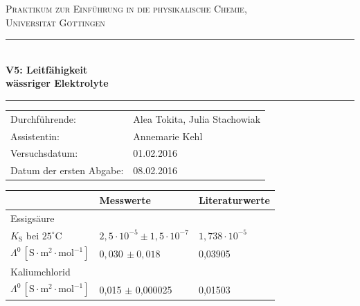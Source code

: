 \documentclass[12pt,a4paper,titlepage,headinclude,bibtotoc]{scrartcl}
\begin{document}
\begin{titlepage}
\centering
\textsc{\Large Praktikum zur Einführung in die physikalische Chemie,\\[1.5ex] Universität Göttingen}

\vspace*{0.5cm}

\rule{\textwidth}{1pt}\\[0.5cm]
{\huge \bfseries
  V5: Leitfähigkeit\\[1.5ex]
  wässriger Elektrolyte}\\[0.5cm]
\rule{\textwidth}{1pt}

\vspace*{0.5cm}


\begin{Large}
\begin{tabular}{ll}
Durchführende: &  Alea Tokita, Julia Stachowiak\\
Assistentin: & Annemarie Kehl\\
 Versuchsdatum: & 01.02.2016\\
 Datum der ersten Abgabe: & 08.02.2016\\

\end{tabular}
\end{Large}

\vspace*{1cm}
\begin{large}
\begin{table} [h]
\centering 
\begin{tabular}{p{3cm}|p{5cm}p{5cm}}
& Messwerte & Literaturwerte\footnotemark\\
\hline
Essigsäure & &\\
 $K_{\mathrm{S}}$  bei $25^\circ\text{C}$ & $2,5 \cdot 10^{-5} \pm 1,5 \cdot 10^{-7}$& $1,738 \cdot 10^{-5}$\\
$\Lambda^0\, [\mathrm{S} \cdot \mathrm{m^2} \cdot \mathrm{mol^{-1}}]$ & $ 0,030\, \pm 0,018 $& 0,03905\\
\hline
Kaliumchlorid & &\\
$\Lambda^0\, [\mathrm{S} \cdot \mathrm{m^2} \cdot \mathrm{mol^{-1}}]$ & 0,015 $\pm$ 0,000025 & 0,01503\\
\end{tabular}
\end{table}
\end{large}


\end{titlepage}
\end{document}
